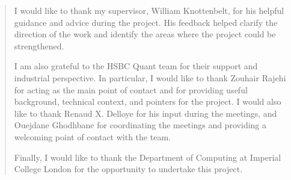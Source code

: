 \documentclass[a4paper, twoside, openany]{report}
\begin{document}
\renewcommand{\abstractname}{Acknowledgements}
\begin{abstract}
I would like to thank my supervisor, William Knottenbelt, for his helpful guidance and advice during the project. His feedback helped clarify the direction of the work and identify the areas where the project could be strengthened.

I am also grateful to the HSBC Quant team for their support and industrial perspective. In particular, I would like to thank Zouhair Rajehi for acting as the main point of contact and for providing useful background, technical context, and pointers for the project. I would also like to thank Renaud X. Delloye for his input during the meetings, and Ouejdane Ghodhbane for coordinating the meetings and providing a welcoming point of contact with the team.

Finally, I would like to thank the Department of Computing at Imperial College London for the opportunity to undertake this project.
\end{abstract}

\tableofcontents




















\end{document}
